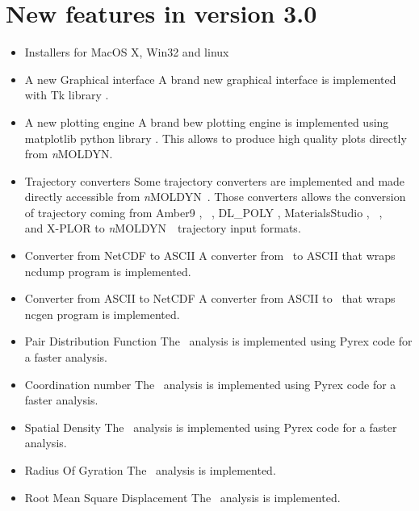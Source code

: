 \documentclass[a4paper,11pt]{report}
\newcommand{\NMOLDYN}{\textit{n}MOLDYN}
\begin{document}
\section{New features in version 3.0}
\label{new_features_in_version_3}

\begin{itemize}
\item{Installers for MacOS X, Win32 and linux}

\item{A new Graphical interface}
A brand new graphical interface is implemented with Tk library \cite{Tk}.

\item{A new plotting engine}
A brand bew plotting engine is implemented using matplotlib python library \cite{matplotlib}. This allows to produce high 
quality plots directly from \NMOLDYN.

\item{Trajectory converters}
Some trajectory converters are implemented and made directly accessible from \NMOLDYN\ \GUI . 
Those converters allows the conversion of trajectory coming from Amber9 \cite{Amber}, \CHARMM\ \cite{CHARMM}, DL\_POLY \cite{DL_POLY}, 
MaterialsStudio \cite{MaterialsStudio}, \NAMD\ \cite{NAMD}, \VASP\ \cite{VASP} and X-PLOR \cite{X-PLOR} to \NMOLDYN\ \MMTK\ trajectory input formats.

\item{Converter from NetCDF to ASCII}
A converter from \NetCDF\ to ASCII that wraps ncdump \cite{ncdump} program is implemented.

\item{Converter from ASCII to NetCDF}
A converter from ASCII to \NetCDF\ that wraps ncgen \cite{ncgen} program is implemented.

\item{Pair Distribution Function}
The \PDF\ analysis is implemented using Pyrex code for a faster analysis.

\item{Coordination number}
The \CN\ analysis is implemented using Pyrex code for a faster analysis.

\item{Spatial Density}
The \SD\ analysis is implemented using Pyrex code for a faster analysis.

\item{Radius Of Gyration}
The \ROG\ analysis is implemented.

\item{Root Mean Square Displacement}
The \RMSD\ analysis is implemented.


\end{itemize}
\end{document}
